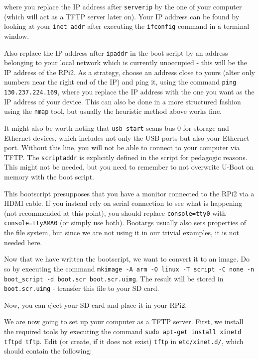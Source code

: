 \documentclass[a4paper,11pt,reqno]{amsart}
\begin{document}
{where you replace the IP address after \texttt{serverip} by the one of your computer (which will act as a TFTP server later on). Your IP address can be found by looking at your \texttt{inet addr} after executing the \texttt{ifconfig} command in a terminal window.

Also replace the IP address after \texttt{ipaddr} in the boot script by an address belonging to your local network which is currently unoccupied - this will be the IP address of the RPi2. As a strategy, choose an address close to yours (alter only numbers near the right end of the IP) and ping it, using the command \texttt{ping 130.237.224.169}, where you replace the IP address with the one you want as the IP address of your device. This can also be done in a more structured fashion using the \texttt{nmap} tool, but usually the heuristic method above works fine. 

It might also be worth noting that \texttt{usb start} scans bus 0 for storage and Ethernet devices, which includes not only the USB ports but also your Ethernet port. Without this line, you will not be able to connect to your computer via TFTP. The \texttt{scriptaddr} is explicitly defined in the script for pedagogic reasons. This might not be needed, but you need to remember to not overwrite U-Boot on memory with the boot script. 

This bootscript presupposes that you have a monitor connected to the RPi2 via a HDMI cable. If you instead rely on serial connection to see what is happening (not recommended at this point), you should replace \texttt{console=tty0} with \texttt{console=ttyAMA0} (or simply use both). Bootargs usually also sets properties of the file system, but since we are not using it in our trivial examples, it is not needed here.

Now that we have written the bootscript, we want to convert it to an image. Do so by executing the command \texttt{mkimage -A arm -O linux -T script -C none -n boot\_script -d boot.scr boot.scr.uimg}. The result will be stored in \texttt{boot.scr.uimg} - transfer this file to your SD card.

Now, you can eject your SD card and place it in your RPi2.

We are now going to set up your computer as a TFTP server. First, we install the required tools by executing the command \texttt{sudo apt-get install xinetd tftpd tftp}. Edit (or create, if it does not exist) \texttt{tftp} in \texttt{etc/xinet.d/}, which should contain the following:

}
\end{document}
